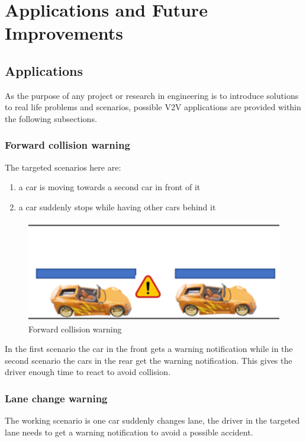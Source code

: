 \chapter{Applications and Future Improvements}

\section{Applications}

As the purpose of any project or research in engineering is to introduce solutions to real life problems and scenarios, possible V2V applications are provided within the following subsections.

\subsection{Forward collision warning}

The targeted scenarios here are:

\begin{enumerate}
    \item  a car is moving towards a second car in front of it
    \item  a car suddenly stops while having other cars behind it
\end{enumerate}

\begin{figure}[h]
    \centering
    \includegraphics[scale=.7]{figure10/1.png}
    \caption{Forward collision warning}
\end{figure}

In the first scenario the car in the front gets a warning notification while in the second scenario the cars in the rear get the warning notification. This gives the driver enough time to react to avoid collision.
\clearpage
\subsection{Lane change warning}

The working scenario is one car suddenly changes lane, the driver in the targeted lane needs to get a warning notification to avoid a possible accident.\\

